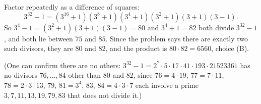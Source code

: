 Factor repeatedly as a difference of squares:
\[
3^{32}-1=(3^{16}+1)(3^8+1)(3^4+1)(3^2+1)(3+1)(3-1).
\]
So $3^4-1=(3^2+1)(3+1)(3-1)=80$ and $3^4+1=82$ both divide $3^{32}-1$, and both lie between $75$ and $85$. Since the problem says there are exactly two such divisors, they are $80$ and $82$, and the product is $80\cdot82=\boxed{6560}$, choice (B).

(One can confirm there are no others: $3^{32}-1=2^7\cdot5\cdot17\cdot41\cdot193\cdot21523361$ has no divisors $76,\dots,84$ other than $80$ and $82$, since $76=4\cdot19$, $77=7\cdot11$, $78=2\cdot3\cdot13$, $79$, $81=3^4$, $83$, $84=4\cdot3\cdot7$ each involve a prime $3,7,11,13,19,79,83$ that does not divide it.)
